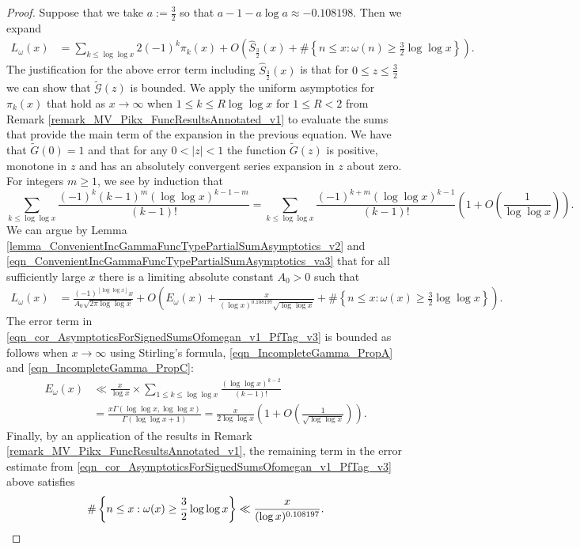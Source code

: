 \documentclass[11pt,reqno,a4letter]{article}
\newcommand{\hlocalref}[1]{\hyperref[#1]{\ref{#1}}}
\numberwithin{equation}{section}
\numberwithin{figure}{section}
\numberwithin{table}{section}
\newcommand{\floor}[1]{\left\lfloor #1 \right\rfloor}
\theoremstyle{plain}
\numberwithin{theorem}{section}
\theoremstyle{definition}
\begin{document}
\begin{proof}
Suppose that we take $a := \frac{3}{2}$ so that $a-1-a\log a \approx -0.108198$. 
Then we expand 
\begin{align*}
L_{\omega}(x) & = 
     \sum_{k \leq \log\log x} 2 (-1)^{k} \pi_k(x) + 
     O\left(\widehat{S}_{\frac{3}{2}}(x) + 
     \#\left\{n \leq x: \omega(n) \geq \frac{3}{2}\log\log x\right\}\right). 
\end{align*} 
The justification for the above error term including $\widehat{S}_{\frac{3}{2}}(x)$ is that for 
$0 \leq z \leq \frac{3}{2}$ we can show that $\widetilde{\mathcal{G}}\left(z\right)$ is bounded. 
We apply the uniform asymptotics for $\pi_k(x)$ that hold as $x \rightarrow \infty$ when 
$1 \leq k \leq R \log\log x$ for $1 \leq R < 2$ from 
Remark \hlocalref{remark_MV_Pikx_FuncResultsAnnotated_v1} to evaluate the sums that provide the 
main term of the expansion in the previous equation. 
We have that $\widetilde{G}(0)=1$ and that for any 
$0 < |z| < 1$ the function $\widetilde{G}(z)$ is positive, monotone in $z$ and 
has an absolutely convergent series expansion in $z$ about zero. 
For integers $m \geq 1$, we see by induction that 
\[
\sum_{k \leq \log\log x} \frac{(-1)^k (k-1)^m (\log\log x)^{k-1-m}}{(k-1)!} = 
     \sum_{k \leq \log\log x} \frac{(-1)^{k+m} (\log\log x)^{k-1}}{(k-1)!} \left( 
     1 + O\left(\frac{1}{\log\log x}\right)\right). 
\]
We can argue 
by Lemma \hlocalref{lemma_ConvenientIncGammaFuncTypePartialSumAsymptotics_v2} 
and \eqref{eqn_ConvenientIncGammaFuncTypePartialSumAsymptotics_va3} 
that for all sufficiently large $x$ 
there is a limiting absolute constant $A_0 > 0$ such that 
\begin{align} 
\label{eqn_cor_AsymptoticsForSignedSumsOfomegan_v1_PfTag_v3} 
L_{\omega}(x) & = \frac{(-1)^{\floor{\log\log x}} x}{A_0 \sqrt{2\pi \log\log x}} + 
     O\left(E_{\omega}(x) + 
     \frac{x}{(\log x)^{0.108197} \sqrt{\log\log x}} + 
     \#\left\{n \leq x: \omega(x) \geq \frac{3}{2}\log\log x\right\}\right). 
\end{align} 
The error term in \eqref{eqn_cor_AsymptoticsForSignedSumsOfomegan_v1_PfTag_v3} 
is bounded as follows when $x \rightarrow \infty$ using Stirling's formula, 
\eqref{eqn_IncompleteGamma_PropA} and 
\eqref{eqn_IncompleteGamma_PropC}:  
\begin{align*} 
E_{\omega}(x) & \ll \frac{x}{\log x} \times 
     \sum_{1 \leq k \leq \log\log x} \frac{(\log\log x)^{k-2}}{(k-1)!} \\ 
     & = 
     \frac{x \Gamma(\log\log x, \log\log x)}{\Gamma(\log\log x + 1)} 
     = \frac{x}{2\log\log x} \left(1 + O\left(\frac{1}{\sqrt{\log\log x}}\right)\right). 
\end{align*}
Finally, by an application of the results in 
Remark \hlocalref{remark_MV_Pikx_FuncResultsAnnotated_v1}, the remaining term in 
the error estimate from \eqref{eqn_cor_AsymptoticsForSignedSumsOfomegan_v1_PfTag_v3} 
above satisfies 
\[
\#\left\{n \leq x: \omega(x) \geq \frac{3}{2}\log\log x\right\} \ll 
     \frac{x}{(\log x)^{0.108197}}. 
     \qedhere 
\] 
\end{proof}
\end{document}
